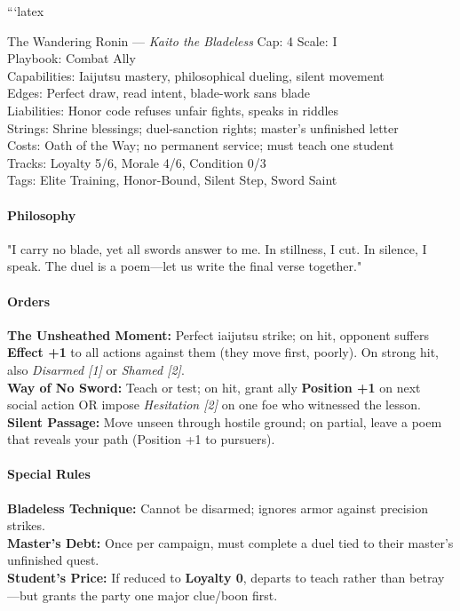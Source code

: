 ```latex
\begin{followerbox}{The Wandering Ronin --- \emph{Kaito the Bladeless}}
Cap: 4 \quad Scale: I \\
Playbook: Combat Ally \\
Capabilities: Iaijutsu mastery, philosophical dueling, silent movement \\
Edges: Perfect draw, read intent, blade-work sans blade \\
Liabilities: Honor code refuses unfair fights, speaks in riddles \\
Strings: Shrine blessings; duel-sanction rights; master's unfinished letter \\
Costs: Oath of the Way; no permanent service; must teach one student \\
Tracks: Loyalty 5/6, Morale 4/6, Condition 0/3 \\
Tags: Elite Training, Honor-Bound, Silent Step, Sword Saint

\paragraph{Philosophy} 
"I carry no blade, yet all swords answer to me. In stillness, I cut. In silence, I speak. The duel is a poem---let us write the final verse together."

\paragraph{Orders}
\textbf{The Unsheathed Moment:} Perfect iaijutsu strike; on hit, opponent suffers \textbf{Effect +1} to all actions against them (they move first, poorly). On strong hit, also \emph{Disarmed [1]} or \emph{Shamed [2]}. \\
\textbf{Way of No Sword:} Teach or test; on hit, grant ally \textbf{Position +1} on next social action OR impose \emph{Hesitation [2]} on one foe who witnessed the lesson. \\
\textbf{Silent Passage:} Move unseen through hostile ground; on partial, leave a poem that reveals your path (Position +1 to pursuers).

\paragraph{Special Rules}
\textbf{Bladeless Technique:} Cannot be disarmed; ignores armor against precision strikes. \\
\textbf{Master's Debt:} Once per campaign, must complete a duel tied to their master's unfinished quest. \\
\textbf{Student's Price:} If reduced to \textbf{Loyalty 0}, departs to teach rather than betray---but grants the party one major clue/boon first.


\end{followerbox}
